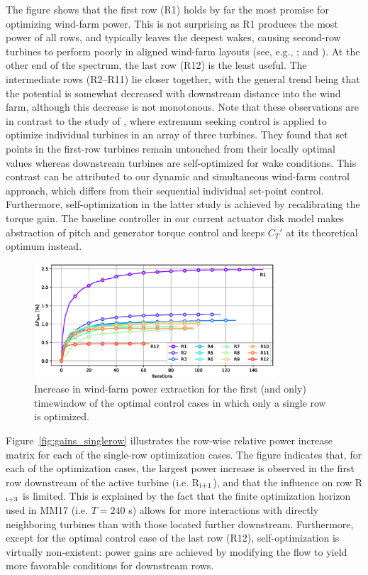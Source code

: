 \documentclass[wes, manuscript]{copernicus}
\newcommand{\revision}[1]{{\color{blue} #1}}
\begin{document}
The figure shows that the first row (R1) holds by far the most promise for optimizing wind-farm power. This is not surprising as R1 produces the most power of all rows, and typically leaves the deepest wakes, causing second-row turbines to perform  poorly in aligned wind-farm layouts (see, e.g., \citealp{porte2013numerical,nilsson2015large}; and \citealp{stevens2016effects}). At the other end of the spectrum, the last row (R12) is the least useful. The intermediate rows (R2--R11) lie closer together, with the general trend being that the potential is somewhat decreased with downstream distance into the wind farm, although this decrease is not monotonous. \revision{Note that these observations are in contrast to the study of \cite{ciri2017large}, where extremum seeking control is applied to optimize individual turbines in an array of three turbines. They found that set points in the first-row turbines remain untouched from their locally optimal values whereas downstream turbines are self-optimized for wake conditions. This contrast can be attributed to our dynamic and simultaneous wind-farm control approach, which differs from their sequential individual set-point control. Furthermore, self-optimization in the latter study is achieved by recalibrating the torque gain. The baseline controller in our current actuator disk model makes abstraction of pitch and generator torque control and keeps $C_T'$ at its theoretical optimum instead. }

\begin{figure}
	\centering
	\includegraphics[width=0.8\textwidth]{figure9}
	\caption{Increase in wind-farm power extraction for the first (and only) timewindow of the optimal control cases in which only a single row is optimized. \label{fig:single_row_opt}}
\end{figure}

Figure~\ref{fig:gains_singlerow} illustrates the row-wise relative power increase matrix for each of the single-row optimization cases. The figure indicates that, for each of the optimization cases, the largest power increase is observed in the first row downstream of the active turbine (i.e. R$_{\rm i+1}$), and that the influence on row R$_{\rm i+3}$ is limited. This is explained by the fact that the finite optimization horizon used in MM17 (i.e. $T = 240$ s) allows for more interactions with directly neighboring turbines than with those located further downstream. Furthermore, except for the optimal control case of the last row (R12), self-optimization is virtually non-existent: power gains are achieved by modifying the flow to yield more favorable conditions for downstream rows. 
\end{document}
